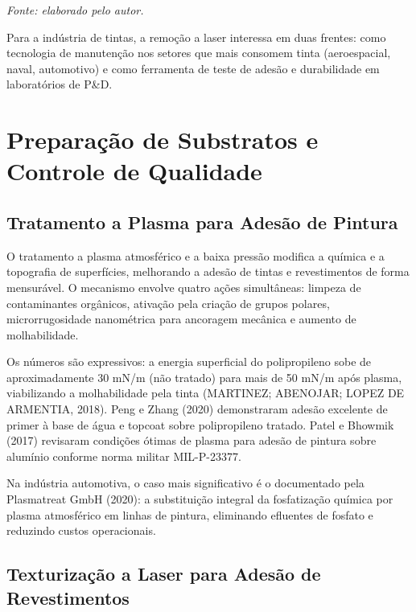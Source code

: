 \documentclass[
  12pt,
  a4paper,
  oneside,
  brazil,
  chapter=TITLE
]{article}
\newcommand{\secbreak}{\clearpage}
\let\oldsection\section
\renewcommand{\section}{\secbreak\oldsection}
\newcommand{\quadrofonte}[1]{\par\noindent\textit{Fonte: #1}\vspace{1em}\par}
\begin{document}
\quadrofonte{elaborado pelo autor.}

Para a indústria de tintas, a remoção a laser interessa em duas frentes: como tecnologia de manutenção nos setores que mais consomem tinta (aeroespacial, naval, automotivo) e como ferramenta de teste de adesão e durabilidade em laboratórios de P\&D.

\section{Preparação de Substratos e Controle de Qualidade}\label{preparacao-substratos}

\subsection{Tratamento a Plasma para Adesão de Pintura}\label{plasma-adesao}

O tratamento a plasma atmosférico e a baixa pressão modifica a química e a topografia de superfícies, melhorando a adesão de tintas e revestimentos de forma mensurável. O mecanismo envolve quatro ações simultâneas: limpeza de contaminantes orgânicos, ativação pela criação de grupos polares, microrrugosidade nanométrica para ancoragem mecânica e aumento de molhabilidade.

Os números são expressivos: a energia superficial do polipropileno sobe de aproximadamente 30 mN/m (não tratado) para mais de 50 mN/m após plasma, viabilizando a molhabilidade pela tinta (MARTINEZ; ABENOJAR; LOPEZ DE ARMENTIA, 2018). Peng e Zhang (2020) demonstraram adesão excelente de primer à base de água e topcoat sobre polipropileno tratado. Patel e Bhowmik (2017) revisaram condições ótimas de plasma para adesão de pintura sobre alumínio conforme norma militar MIL-P-23377.

Na indústria automotiva, o caso mais significativo é o documentado pela Plasmatreat GmbH (2020): a substituição integral da fosfatização química por plasma atmosférico em linhas de pintura, eliminando efluentes de fosfato e reduzindo custos operacionais.

\subsection{Texturização a Laser para Adesão de Revestimentos}\label{texturizacao-laser}
\end{document}
